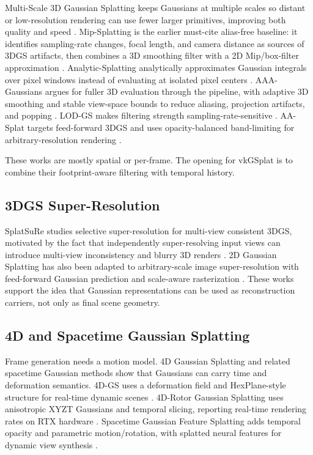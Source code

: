 \documentclass[11pt]{article}
\begin{document}
Multi-Scale 3D Gaussian Splatting keeps Gaussians at multiple scales so distant
or low-resolution rendering can use fewer larger primitives, improving both
quality and speed \cite{yan2024multiscale}. Mip-Splatting is the earlier
must-cite alias-free baseline: it identifies sampling-rate changes, focal
length, and camera distance as sources of 3DGS artifacts, then combines a 3D
smoothing filter with a 2D Mip/box-filter approximation \cite{yu2024mipsplat}.
Analytic-Splatting analytically approximates Gaussian integrals over pixel
windows instead of evaluating at isolated pixel centers
\cite{liang2024analytic}. AAA-Gaussians argues for fuller 3D evaluation
through the pipeline, with adaptive 3D smoothing and stable view-space bounds
to reduce aliasing, projection artifacts, and popping \cite{steiner2025aaa}.
LOD-GS makes filtering strength sampling-rate-sensitive \cite{yang2025lodgs}.
AA-Splat targets feed-forward 3DGS and uses opacity-balanced band-limiting for
arbitrary-resolution rendering \cite{suh2026aasplat}.

These works are mostly spatial or per-frame. The opening for vkGSplat is to
combine their footprint-aware filtering with temporal history.

\subsection{3DGS Super-Resolution}

SplatSuRe studies selective super-resolution for multi-view consistent 3DGS,
motivated by the fact that independently super-resolving input views can
introduce multi-view inconsistency and blurry 3D renders \cite{asthana2026splatsure}.
2D Gaussian Splatting has also been adapted to arbitrary-scale image
super-resolution with feed-forward Gaussian prediction and scale-aware
rasterization \cite{chen2025gassr}. These works support the idea that Gaussian
representations can be used as reconstruction carriers, not only as final
scene geometry.

\subsection{4D and Spacetime Gaussian Splatting}

Frame generation needs a motion model. 4D Gaussian Splatting and related
spacetime Gaussian methods show that Gaussians can carry time and deformation
semantics. 4D-GS uses a deformation field and HexPlane-style structure for
real-time dynamic scenes \cite{wu2024dynamic4dgs}. 4D-Rotor Gaussian Splatting
uses anisotropic XYZT Gaussians and temporal slicing, reporting real-time
rendering rates on RTX hardware \cite{duan2024rotor4dgs}. Spacetime Gaussian
Feature Splatting adds temporal opacity and parametric motion/rotation, with
splatted neural features for dynamic view synthesis \cite{li2023spacetime}.
\end{document}
